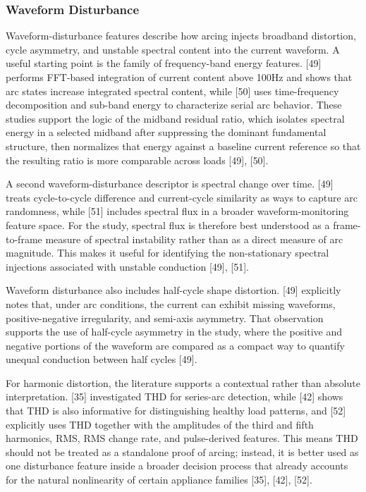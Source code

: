 \subsubsection{Waveform Disturbance}\label{sec:waveform-disturbance}

Waveform-disturbance features describe how arcing injects broadband
distortion, cycle asymmetry, and unstable spectral content into the
current waveform. A useful starting point is the family of
frequency-band energy features. {[}49{]} performs FFT-based integration
of current content above 100Hz and shows that arc states increase
integrated spectral content, while {[}50{]} uses time-frequency
decomposition and sub-band energy to characterize serial arc behavior.
These studies support the logic of the midband residual ratio, which
isolates spectral energy in a selected midband after suppressing the
dominant fundamental structure, then normalizes that energy against a
baseline current reference so that the resulting ratio is more
comparable across loads {[}49{]}, {[}50{]}.

A second waveform-disturbance descriptor is spectral change over time.
{[}49{]} treats cycle-to-cycle difference and current-cycle similarity
as ways to capture arc randomness, while {[}51{]} includes spectral flux
in a broader waveform-monitoring feature space. For the study, spectral
flux is therefore best understood as a frame-to-frame measure of
spectral instability rather than as a direct measure of arc magnitude.
This makes it useful for identifying the non-stationary spectral
injections associated with unstable conduction {[}49{]}, {[}51{]}.

Waveform disturbance also includes half-cycle shape distortion. {[}49{]}
explicitly notes that, under arc conditions, the current can exhibit
missing waveforms, positive-negative irregularity, and semi-axis
asymmetry. That observation supports the use of half-cycle asymmetry in
the study, where the positive and negative portions of the waveform are
compared as a compact way to quantify unequal conduction between half
cycles {[}49{]}.

For harmonic distortion, the literature supports a contextual rather
than absolute interpretation. {[}35{]} investigated THD for series-arc
detection, while {[}42{]} shows that THD is also informative for
distinguishing healthy load patterns, and {[}52{]} explicitly uses THD
together with the amplitudes of the third and fifth harmonics, RMS, RMS
change rate, and pulse-derived features. This means THD should not be
treated as a standalone proof of arcing; instead, it is better used as
one disturbance feature inside a broader decision process that already
accounts for the natural nonlinearity of certain appliance families
{[}35{]}, {[}42{]}, {[}52{]}.

